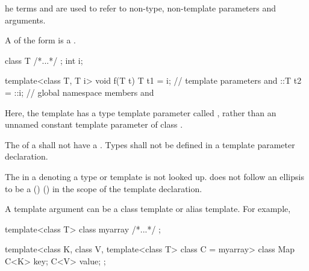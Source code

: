 \documentclass{wg21}
\begin{document}

\begin{removedblock}
\begin{wfootnote}
    he terms
    and
    are used to refer to non-type, non-template parameters and arguments.
\end{wfootnote}
\end{removedblock}

A  of the form
  is a .
\begin{example}
\begin{codeblock}
    class T { /*...*/ };
    int i;

    template<class T, T i> void f(T t) {
        T t1 = i;         // template parameters  and 
        ::T t2 = ::i;     // global namespace members  and 
    }
\end{codeblock}
Here, the template  has a type template parameter
called , rather than an unnamed constant
template parameter of class .
\end{example}
The  of a 
shall not have a .
Types shall not be defined in a template parameter
declaration.

\pnum
The  in a 
{ denoting a type or template} is not looked up.
   does not follow an ellipsis
to be a
()\added{,}
()
in the scope of the template declaration.

\begin{note}
A template argument 
can be a class template or alias template.
For example,

\begin{codeblock}
    template<class T> class myarray { /*...*/ };

    template<class K, class V, template<class T> class C = myarray>
    class Map {
        C<K> key;
        C<V> value;
    };
\end{codeblock}
\end{note}
\end{document}
